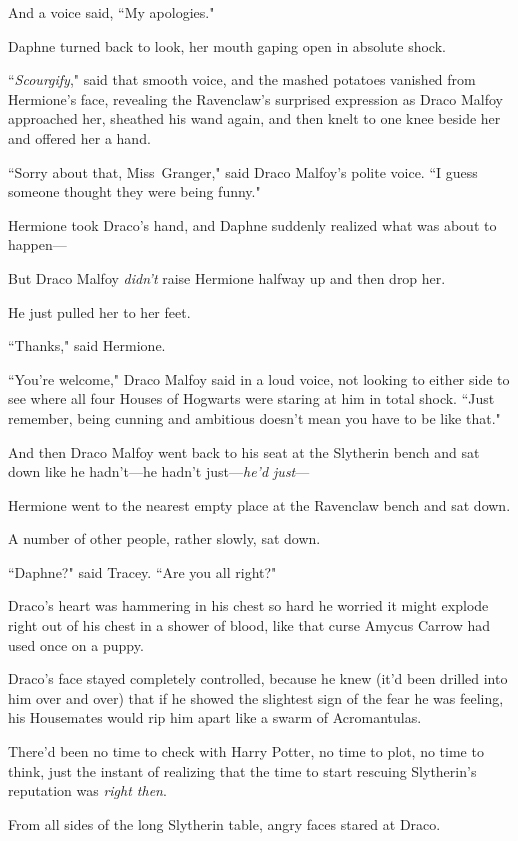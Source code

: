 And a voice said, ``My apologies."

Daphne turned back to look, her mouth gaping open in absolute shock.

``\emph{Scourgify}," said that smooth voice, and the mashed potatoes vanished from Hermione's face, revealing the Ravenclaw's surprised expression as Draco Malfoy approached her, sheathed his wand again, and then knelt to one knee beside her and offered her a hand.

``Sorry about that, Miss~Granger," said Draco Malfoy's polite voice. ``I guess someone thought they were being funny."

Hermione took Draco's hand, and Daphne suddenly realized what was about to happen—

But Draco Malfoy \emph{didn't} raise Hermione halfway up and then drop her.

He just pulled her to her feet.

``Thanks," said Hermione.

``You're welcome," Draco Malfoy said in a loud voice, not looking to either side to see where all four Houses of Hogwarts were staring at him in total shock. ``Just remember, being cunning and ambitious doesn't mean you have to be like that."

And then Draco Malfoy went back to his seat at the Slytherin bench and sat down like he hadn't—he hadn't just—\emph{he'd just}—

Hermione went to the nearest empty place at the Ravenclaw bench and sat down.

A number of other people, rather slowly, sat down.

``Daphne?" said Tracey. ``Are you all right?"

\later

Draco's heart was hammering in his chest so hard he worried it might explode right out of his chest in a shower of blood, like that curse Amycus Carrow had used once on a puppy.

Draco's face stayed completely controlled, because he knew (it'd been drilled into him over and over) that if he showed the slightest sign of the fear he was feeling, his Housemates would rip him apart like a swarm of Acromantulas.

There'd been no time to check with Harry Potter, no time to plot, no time to think, just the instant of realizing that the time to start rescuing Slytherin's reputation was \emph{right then}.

From all sides of the long Slytherin table, angry faces stared at Draco.

